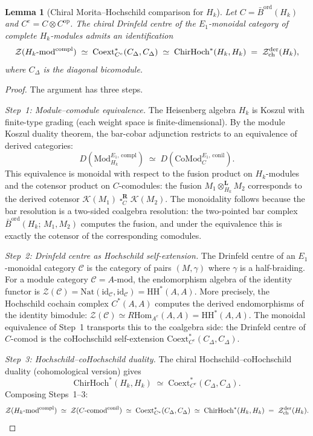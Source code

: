 \documentclass[11pt,reqno]{amsart}
\newtheorem{lemma}[theorem]{Lemma}
\theoremstyle{definition}
\theoremstyle{remark}
\providecommand{\cC}{\mathcal{C}}
\providecommand{\cZ}{\mathcal{Z}}
\providecommand{\Eone}{E_1}
\providecommand{\Barord}{\bar{B}^{\mathrm{ord}}}
\providecommand{\ChirHoch}{\mathrm{ChirHoch}}
\providecommand{\HH}{\mathrm{HH}}
\providecommand{\id}{\mathrm{id}}
\providecommand{\Hom}{\mathrm{Hom}}
\begin{document}
\begin{lemma}[Chiral Morita--Hochschild comparison for $H_k$]
\label{lem:e-heis-morita-hochschild}
Let $C = \Barord(H_k)$ and $C^e = C \otimes C^{\mathrm{op}}$. The
chiral Drinfeld centre of the $\Eone$-monoidal category of complete
$H_k$-modules admits an identification
\begin{equation}\label{eq:e-heis-morita}
\mathcal Z(H_k\textup{-mod}^{\mathrm{compl}})
\;\simeq\;
\mathrm{Coext}_{C^e}^*(C_\Delta, C_\Delta)
\;\simeq\;
\ChirHoch^*(H_k, H_k)
\;=\;
\cZ^{\mathrm{der}}_{\mathrm{ch}}(H_k),
\end{equation}
where $C_\Delta$ is the diagonal bicomodule.
\end{lemma}

\begin{proof}
The argument has three steps.

\emph{Step~1: Module--comodule equivalence.}
The Heisenberg algebra $H_k$ is Koszul with
finite-type grading (each weight space is
finite-dimensional). By the module Koszul
duality theorem, the bar-cobar adjunction
restricts to an equivalence of derived
categories:
\[
D(\mathrm{Mod}^{\Eone,\,\mathrm{compl}}_{H_k})
\;\simeq\;
D(\mathrm{CoMod}^{\Eone,\,\mathrm{conil}}_{C}).
\]
This equivalence is monoidal with respect to the fusion product on
$H_k$-modules and the cotensor product on $C$-comodules: the fusion
$M_1 \otimes_{H_k}^{\mathbf{L}} M_2$ corresponds to the derived
cotensor $\mathcal{K}(M_1) \mathbin{\square}_C^{\mathbf{R}} \mathcal{K}(M_2)$.
The monoidality follows because the bar
resolution is a two-sided coalgebra resolution:
the two-pointed bar complex
$\Barord(H_k;\, M_1, M_2)$ computes the fusion,
and under the equivalence this is exactly the
cotensor of the corresponding comodules.

\emph{Step~2: Drinfeld centre as Hochschild self-extension.}
The Drinfeld centre of an $\Eone$-monoidal category $\cC$
is the category of pairs $(M, \gamma)$ where $\gamma$
is a half-braiding. For a module category $\cC = A\text{-mod}$,
the endomorphism algebra of the identity functor is
$\mathcal Z(\cC) = \mathrm{Nat}(\id_\cC, \id_\cC)
= \HH^*(A, A)$.
More precisely, the Hochschild cochain complex
$C^*(A, A)$ computes the derived endomorphisms
of the identity bimodule:
$\mathcal Z(\cC) \simeq R\!\Hom_{A^e}(A, A) = \HH^*(A, A)$.
The monoidal equivalence of Step~1 transports this to
the coalgebra side: the Drinfeld centre of
$C$-comod is the coHochschild self-extension
$\mathrm{Coext}_{C^e}^*(C_\Delta, C_\Delta)$.

\emph{Step~3: Hochschild--coHochschild duality.}
The chiral Hochschild--coHochschild duality
(cohomological version) gives
\[
\ChirHoch^*(H_k, H_k)
\;\simeq\;
\mathrm{Coext}_{C^e}^*(C_\Delta, C_\Delta).
\]
Composing Steps~1--3:
\[
\mathcal Z(H_k\text{-mod}^{\mathrm{compl}})
\;\simeq\;
\mathcal Z(C\text{-comod}^{\mathrm{conil}})
\;\simeq\;
\mathrm{Coext}_{C^e}^*(C_\Delta, C_\Delta)
\;\simeq\;
\ChirHoch^*(H_k, H_k)
\;=\;
\cZ^{\mathrm{der}}_{\mathrm{ch}}(H_k). \qedhere
\]
\end{proof}
\end{document}
